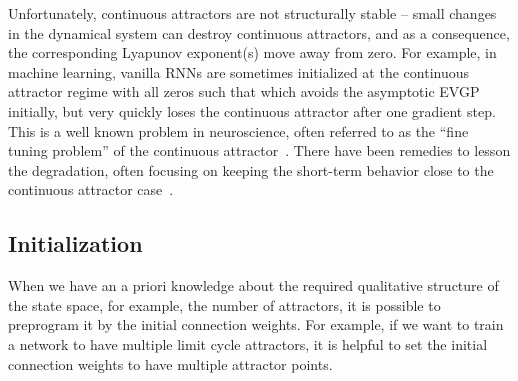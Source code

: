 \documentclass{article}
\newcommand{\dm}[1]{\ensuremath{\mathrm{d}{#1}}} %
\newcommand{\RN}[2]{\frac{\dm{#1}}{\dm{#2}}} %
\theoremstyle{definition}
\theoremstyle{remark}
\begin{document}
Unfortunately, continuous attractors are not structurally stable -- small changes in the dynamical system can destroy continuous attractors, and as a consequence, the corresponding Lyapunov exponent(s) move away from zero.
For example, in machine learning, vanilla RNNs are sometimes initialized at the continuous attractor regime with all zeros such that 
 which avoids the asymptotic EVGP initially, but very quickly loses the continuous attractor after one gradient step.
This is a well known problem in neuroscience, often referred to as the ``fine tuning problem'' of the continuous attractor~\cite{Seung1996,Renart2003,Noorman2022}.
There have been remedies to lesson the degradation, often focusing on keeping the short-term behavior close to the continuous attractor case~\cite{Lim2012,Lim2013,Boerlin2013,Koulakov2002}.



\subsection{Initialization}

When we have an a priori knowledge about the required qualitative structure of the state space, for example, the number of attractors, it is possible to preprogram it by the initial connection weights. For example, if we want to train a network to have multiple limit cycle attractors, it is helpful to set the initial connection weights to have multiple attractor points. %


\end{document}
